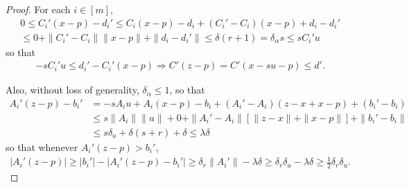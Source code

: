 \begin{proof}
For each $i \in [m]$,
\begin{align*}
0 \le C_i'(x-p) - d_i'
\le C_i(x - p) - d_i + (C_i' - C_i)(x-p) + d_i - d_i'  \\
\le 0 + \|C_i' - C_i\| \|x - p\| + \|d_i - d_i'\| 
\le \delta (r+1)
= \delta_{\alpha} s \le sC_i'u
\end{align*}
so that
\begin{align}
-sC_i'u \le d_i' - C_i'(x - p) \Longrightarrow C'(z - p) = C'(x - su - p) \le d'. \label{reun_eqn3}
\end{align}

Also, without loss of generality, $\delta_{\alpha} \le 1$, so that
\begin{align}
A_i'(z - p) - b_i' 
&= - s A_iu + A_i(x - p) - b_i + (A_i' - A_i)(z - x + x - p) + (b_i' - b_i) \nonumber \\
&\le s \|A_i\|\|u\| + 0 + \|A_i' - A_i\|\left[\|z - x\| + \|x - p\|\right] + \|b_i'-b_i\| \nonumber \\
&\le s\delta_u + \delta \left(s + r\right) + \delta \le \lambda \delta \label{reun_eqn1}
\end{align}
so that whenever $A_i'(z - p) > b_i'$,
\begin{align}
\left|A_i'(z - p)\right| 
\ge |b_i'| - \left| A_i'(z - p) - b_i'\right| 
\ge \delta_r\|A_i'\| - \lambda \delta 
\ge \delta_r \delta_u - \lambda \delta \ge \frac 1 2 \delta_r \delta_u. \label{reun_eqn2}
\end{align}


\end{proof}
